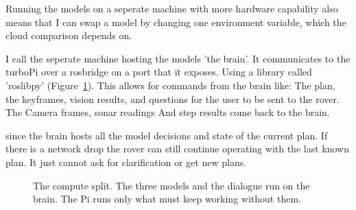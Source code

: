 Running the models on a seperate machine with more hardware capability also means that I can swap a model
by changing one environment variable, which the cloud comparison depends on.

I call the seperate machine hosting the models 'the brain'. It communicates to the turboPi over a rosbridge on a port
that it exposes. Using a library called 'roslibpy' (Figure~\ref{fig:split}). This allows for commands from the brain like: The plan,
the keyframes, vision results, and questions for the user to be sent to the rover. The Camera frames, sonar readings And
step results come back to the brain. 

since the brain hosts all the model decisions and state of the current plan. If there is a network drop the rover can still continue operating
with the last known plan. It just cannot ask for clarification or get new plans. 



\begin{figure}[htbp]
  \centering
  \caption{The compute split. The three models and the dialogue run on the brain. The Pi runs only what must keep working without them.}
  \label{fig:split}
\end{figure}

